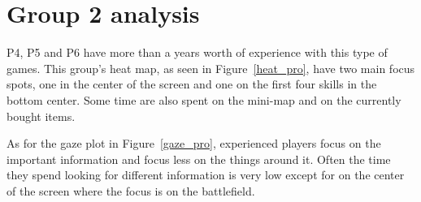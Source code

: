 \documentclass{report}
\begin{document}
\section{Group 2 analysis}
P4, P5 and P6 have more than a years worth of experience with this type of games. This group's heat map, as seen in Figure~\ref{heat_pro}, have two main focus spots, one in the center of the screen and one on the first four skills in the bottom center. Some time are also spent on the mini-map and on the currently bought items.

As for the gaze plot in Figure~\ref{gaze_pro}, experienced players focus on the important information and focus less on the things around it. Often the time they spend looking for different information is very low except for on the center of the screen where the focus is on the battlefield.
\end{document}
